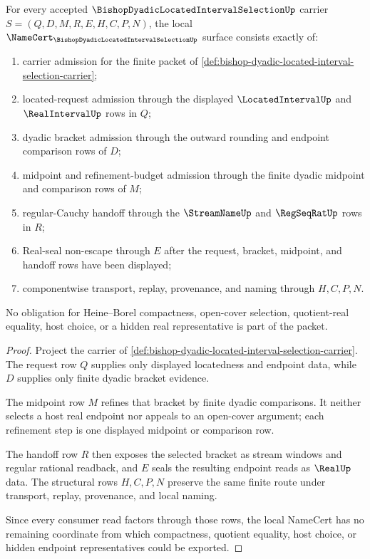 \begin{theorem}
\label{thm:bishop-dyadic-located-interval-selection-obligations}
For every accepted $\BishopDyadicLocatedIntervalSelectionUp$ carrier $S=(Q,D,M,R,E,H,C,P,N)$, the local $\NameCert_{\BishopDyadicLocatedIntervalSelectionUp}$ surface consists exactly of:
\begin{enumerate}
\item carrier admission for the finite packet of \autoref{def:bishop-dyadic-located-interval-selection-carrier};
\item located-request admission through the displayed $\LocatedIntervalUp$ and $\RealIntervalUp$ rows in $Q$;
\item dyadic bracket admission through the outward rounding and endpoint comparison rows of $D$;
\item midpoint and refinement-budget admission through the finite dyadic midpoint and comparison rows of $M$;
\item regular-Cauchy handoff through the $\StreamNameUp$ and $\RegSeqRatUp$ rows in $R$;
\item Real-seal non-escape through $E$ after the request, bracket, midpoint, and handoff rows have been displayed;
\item componentwise transport, replay, provenance, and naming through $H,C,P,N$.
\end{enumerate}
No obligation for Heine--Borel compactness, open-cover selection, quotient-real equality, host choice, or a hidden real representative is part of the packet.
\end{theorem}
\begin{proof}
Project the carrier of \autoref{def:bishop-dyadic-located-interval-selection-carrier}. The request row $Q$ supplies only displayed locatedness and endpoint data, while $D$ supplies only finite dyadic bracket evidence.

The midpoint row $M$ refines that bracket by finite dyadic comparisons. It neither selects a host real endpoint nor appeals to an open-cover argument; each refinement step is one displayed midpoint or comparison row.

The handoff row $R$ then exposes the selected bracket as stream windows and regular rational readback, and $E$ seals the resulting endpoint reads as $\RealUp$ data. The structural rows $H,C,P,N$ preserve the same finite route under transport, replay, provenance, and local naming.

Since every consumer read factors through those rows, the local NameCert has no remaining coordinate from which compactness, quotient equality, host choice, or hidden endpoint representatives could be exported.
\end{proof}


